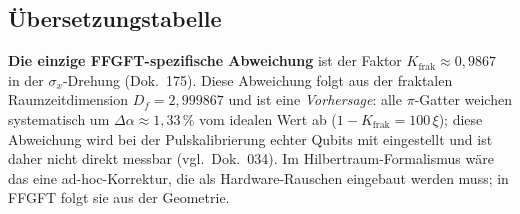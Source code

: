 \subsection{Übersetzungstabelle}

\begin{center}
\renewcommand{\arraystretch}{1.4}
{\small
{}
}
\renewcommand{\arraystretch}{1.0}
\end{center}

\textbf{Die einzige FFGFT-spezifische Abweichung} ist der Faktor
$K_{\text{frak}} \approx 0{,}9867$ in der $\sigma_x$-Drehung
(Dok.~175). Diese Abweichung folgt aus der fraktalen Raumzeitdimension
$D_f = 2{,}999867$ und ist eine \emph{Vorhersage}: alle
$\pi$-Gatter weichen systematisch um $\Delta\alpha \approx 1{,}33\,\%$
vom idealen Wert ab ($1-K_{\text{frak}} = 100\,\xi$); diese Abweichung
wird bei der Pulskalibrierung echter Qubits mit eingestellt und ist
daher nicht direkt messbar (vgl.\ Dok.~034). Im Hilbertraum-Formalismus wäre das eine
ad-hoc-Korrektur, die als Hardware-Rauschen eingebaut werden muss;
in FFGFT folgt sie aus der Geometrie.


